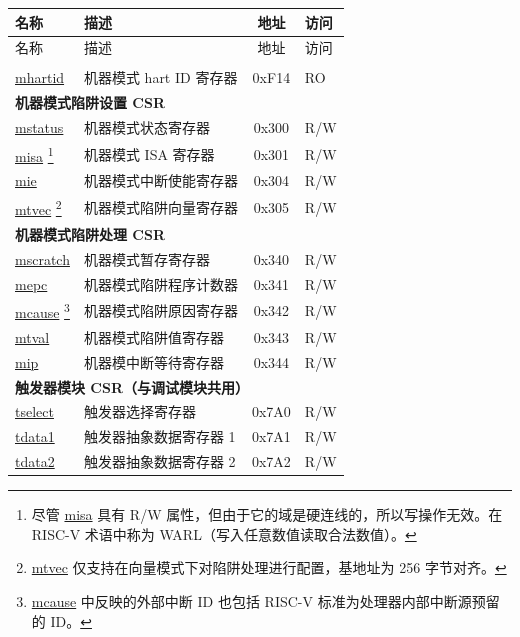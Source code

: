 \begin{longtable}{ | p{4.0cm} | p{8.4cm} | c | l | }
\hline\rowcolor{lightgray}
名称 & 描述 & 地址 & 访问 \\ \hline
\endfirsthead
\hline
\rowcolor{lightgray}
名称 & 描述 & 地址 & 访问 \\
\hline
\endhead
\endfoot

\multicolumn{4}{|l|}{\textbf{机器模式信息 CSR}} \\\hline
\hyperref[regdesc:LPMHARTID]{mhartid} & 机器模式 hart ID 寄存器 & 0xF14 & RO \\\hline

\multicolumn{4}{|l|}{\textbf{机器模式陷阱设置 CSR}} \\\hline
\hyperref[regdesc:LPMSTATUS]{mstatus} & 机器模式状态寄存器 & 0x300 & R/W \\\hline
\hyperref[regdesc:LPMISA]{misa} \footnote{尽管 \hyperref[regdesc:LPMISA]{misa} 具有 R/W 属性，但由于它的域是硬连线的，所以写操作无效。在 RISC-V 术语中称为 WARL（写入任意数值读取合法数值）。} & 机器模式 ISA 寄存器 & 0x301 & R/W \\\hline
\hyperref[regdesc:LPMIE]{mie} & 机器模式中断使能寄存器 & 0x304 & R/W \\\hline
\hyperref[regdesc:LPMTVEC]{mtvec} \footnote{\hyperref[regdesc:LPMTVEC]{mtvec} 仅支持在向量模式下对陷阱处理进行配置，基地址为 256 字节对齐。} & 机器模式陷阱向量寄存器 & 0x305 & R/W \\\hline

\multicolumn{4}{|l|}{\textbf{机器模式陷阱处理 CSR}} \\\hline
\hyperref[regdesc:LPMSCRATCH]{mscratch} & 机器模式暂存寄存器 & 0x340 & R/W \\\hline
\hyperref[regdesc:LPMEPC]{mepc} & 机器模式陷阱程序计数器 & 0x341 & R/W \\\hline
\hyperref[regdesc:LPMCAUSE]{mcause} \footnote{\hyperref[regdesc:LPMCAUSE]{mcause} 中反映的外部中断 ID 也包括 RISC-V 标准为处理器内部中断源预留的 ID。} & 机器模式陷阱原因寄存器 & 0x342 & R/W \\\hline
\hyperref[regdesc:LPMTVAL]{mtval} & 机器模式陷阱值寄存器 & 0x343 & R/W \\\hline
\hyperref[regdesc:LPMIP]{mip} & 机器模中断等待寄存器 & 0x344 & R/W \\\hline
\multicolumn{4}{|l|}{\textbf{触发器模块 CSR（与调试模块共用）}} \\\hline
\hyperref[regdesc:LPTSELECT]{tselect} & 触发器选择寄存器 & 0x7A0 & R/W \\\hline
\hyperref[regdesc:LPTDATA1]{tdata1} & 触发器抽象数据寄存器 1  & 0x7A1 & R/W \\\hline
\hyperref[regdesc:LPTDATA2]{tdata2} & 触发器抽象数据寄存器 2 & 0x7A2 & R/W \\\hline


\end{longtable}
